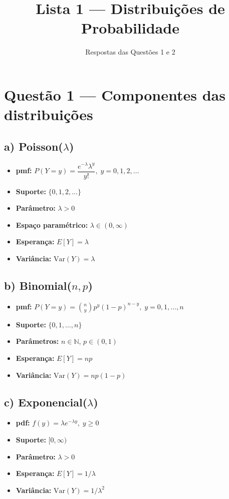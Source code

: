 \documentclass[a4paper,12pt]{article}
\title{Lista 1 --- Distribuições de Probabilidade}
\author{Respostas das Questões 1 e 2}
\date{}
\begin{document}
\maketitle

\section*{Questão 1 — Componentes das distribuições}

\subsection*{a) Poisson($\lambda$)}
\begin{itemize}
\item \textbf{pmf:} $P(Y=y)=\dfrac{e^{-\lambda}\lambda^{y}}{y!},\; y=0,1,2,\dots$
\item \textbf{Suporte:} $\{0,1,2,\dots\}$
\item \textbf{Parâmetro:} $\lambda>0$
\item \textbf{Espaço paramétrico:} $\lambda\in(0,\infty)$
\item \textbf{Esperança:} $E[Y]=\lambda$
\item \textbf{Variância:} $\mathrm{Var}(Y)=\lambda$
\end{itemize}

\subsection*{b) Binomial($n,p$)}
\begin{itemize}
\item \textbf{pmf:} $P(Y=y)=\binom{n}{y} p^{y}(1-p)^{n-y},\; y=0,1,\dots,n$
\item \textbf{Suporte:} $\{0,1,\dots,n\}$
\item \textbf{Parâmetros:} $n\in\mathbb{N}$, $p\in(0,1)$
\item \textbf{Esperança:} $E[Y]=np$
\item \textbf{Variância:} $\mathrm{Var}(Y)=np(1-p)$
\end{itemize}

\subsection*{c) Exponencial($\lambda$)}
\begin{itemize}
\item \textbf{pdf:} $f(y)=\lambda e^{-\lambda y},\; y\ge0$
\item \textbf{Suporte:} $[0,\infty)$
\item \textbf{Parâmetro:} $\lambda>0$
\item \textbf{Esperança:} $E[Y]=1/\lambda$
\item \textbf{Variância:} $\mathrm{Var}(Y)=1/\lambda^2$
\end{itemize}
\end{document}
